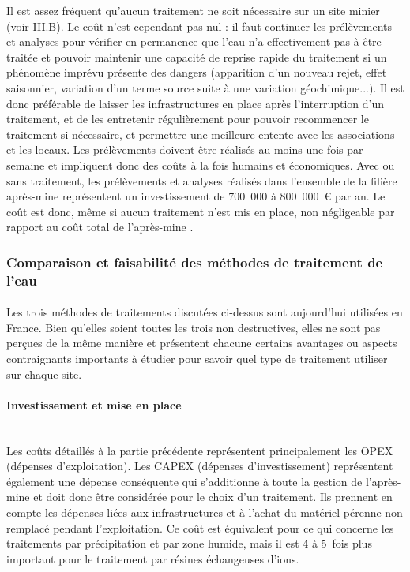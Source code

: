 \documentclass{article}
\begin{document}
Il est assez fréquent qu’aucun traitement ne soit nécessaire sur un site minier (voir III.B). Le coût n’est cependant pas nul : il faut continuer les prélèvements et analyses pour vérifier en permanence que l’eau n’a effectivement pas à être traitée et pouvoir maintenir une capacité de reprise rapide du traitement si un phénomène imprévu présente des dangers (apparition d’un nouveau rejet, effet saisonnier, variation d'un terme source suite à une variation géochimique...). Il est donc préférable de laisser les infrastructures en place après l'interruption d’un traitement, et de les entretenir régulièrement pour pouvoir recommencer le traitement si nécessaire, et permettre  une meilleure entente avec les associations et les locaux.  Les prélèvements doivent être réalisés au moins une fois par semaine et impliquent donc des coûts à la fois humains et économiques. Avec ou sans traitement, les prélèvements et analyses réalisés dans l’ensemble de la filière après-mine représentent un investissement de 700~000 à 800~000~\euro{} par an. Le coût est donc, même si aucun traitement n’est mis en place, non négligeable par rapport au coût total de l’après-mine \cite{schick_informations_2020}. 

\subsubsection{Comparaison et faisabilité des méthodes de traitement de l'eau}
\paragraph{} Les trois méthodes de traitements discutées ci-dessus sont aujourd’hui utilisées en France. Bien qu’elles soient toutes les trois non destructives, elles ne sont pas perçues de la même manière et présentent chacune certains avantages ou aspects contraignants importants à étudier pour savoir quel type de traitement utiliser sur chaque site.

\paragraph{Investissement et mise en place \\ \\}

Les coûts détaillés à la partie précédente représentent principalement les OPEX (dépenses d’exploitation). Les CAPEX (dépenses d’investissement) représentent également une dépense conséquente qui s'additionne à toute la gestion de l’après-mine et doit donc être considérée pour le choix d'un traitement. Ils prennent en compte les dépenses liées aux infrastructures et à l’achat du matériel pérenne non remplacé pendant l’exploitation. Ce coût est équivalent pour ce qui concerne les traitements par précipitation et par zone humide, mais il est 4 à 5~fois plus important pour le traitement par résines échangeuses d’ions.
\end{document}
